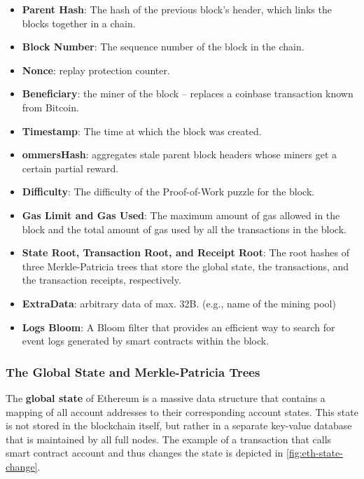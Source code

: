 \begin{itemize}
	\tightlist
	\item
	\textbf{Parent Hash}: The hash of the previous block's header, which
	links the blocks together in a chain.
	\item
	\textbf{Block Number}: The sequence number of the block in the chain.
	\item \textbf{Nonce}: replay protection counter.
	\item \textbf{Beneficiary}: the miner of the block -- replaces a coinbase transaction known from Bitcoin.
	\item
	\textbf{Timestamp}: The time at which the block was created.
	\item \textbf{ommersHash}: aggregates stale parent block headers whose miners get a certain partial reward.	
	\item
	\textbf{Difficulty}: The difficulty of the Proof-of-Work puzzle for
	the block.
	\item
	\textbf{Gas Limit and Gas Used}: The maximum amount of gas allowed in
	the block and the total amount of gas used by all the transactions in
	the block.
	\item
	\textbf{State Root, Transaction Root, and Receipt Root}: The root
	hashes of three Merkle-Patricia trees that store the global state, the
	transactions, and the transaction receipts, respectively.
	\item \textbf{ExtraData}: arbitrary data of max. 32B. (e.g., name of the mining pool)
	\item
	\textbf{Logs Bloom}: A Bloom filter that provides an efficient way to
	search for event logs generated by smart contracts within the block.
\end{itemize}

\subsubsection{The Global State and Merkle-Patricia
	Trees}\label{the-global-state-and-merkle-patricia-trees}

The \textbf{global state} of Ethereum is a massive data structure that
contains a mapping of all account addresses to their corresponding
account states. This state is not stored in the blockchain itself, but
rather in a separate key-value database that is maintained by all full
nodes.
The example of a transaction that calls smart contract account and thus changes the state is depicted in \autoref{fig:eth-state-change}.


